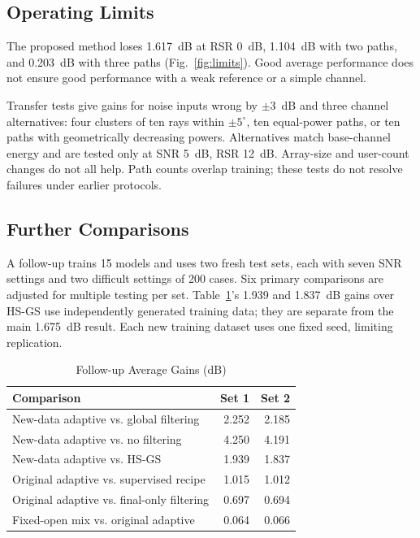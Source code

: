 \documentclass[journal]{IEEEtran}
\begin{document}
\subsection{Operating Limits}
The proposed method loses 1.617~dB at RSR 0~dB, 1.104~dB with two paths,
and 0.203~dB with three paths (Fig.~\ref{fig:limits}). Good average
performance does not ensure good performance with a weak reference or
a simple channel.

Transfer tests give gains for noise inputs wrong by $\pm3$~dB and three
channel alternatives: four clusters of ten rays within $\pm5^\circ$,
ten equal-power paths, or ten paths with geometrically decreasing powers.
Alternatives match base-channel energy and are tested only at SNR 5~dB,
RSR 12~dB. Array-size and user-count changes do not all help. Path counts
overlap training; these tests do not resolve failures under earlier protocols.

\subsection{Further Comparisons}
A follow-up trains 15 models and uses two fresh test sets, each with
seven SNR settings and two difficult settings of 200 cases.
Six primary comparisons are adjusted for multiple testing per set.
Table~\ref{tab:checks}'s 1.939 and 1.837~dB gains over HS-GS use independently
generated training data; they are separate from the main 1.675~dB result.
Each new training dataset uses one fixed seed, limiting replication.

\begin{table}[!t]
\caption{Follow-up Average Gains (dB)}\label{tab:checks}
\centering\small
\begin{tabular}{@{}p{}rr@{}}\toprule
Comparison & Set 1 & Set 2\\\midrule
New-data adaptive vs. global filtering & 2.252 & 2.185\\
New-data adaptive vs. no filtering & 4.250 & 4.191\\
New-data adaptive vs. HS-GS & 1.939 & 1.837\\
Original adaptive vs. supervised recipe & 1.015 & 1.012\\
Original adaptive vs. final-only filtering & 0.697 & 0.694\\
Fixed-open mix vs. original adaptive & 0.064 & 0.066\\\bottomrule
\end{tabular}
\end{table}
\end{document}
